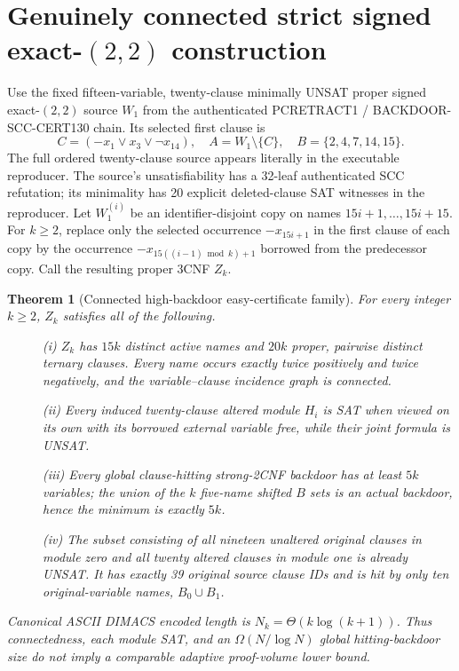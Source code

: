 \documentclass[11pt]{article}
\newtheorem{theorem}{Theorem}
\begin{document}
\section{Genuinely connected strict signed exact-$(2,2)$ construction}
Use the fixed fifteen-variable, twenty-clause minimally UNSAT proper signed exact-$(2,2)$ source $W_1$ from the authenticated PCRETRACT1 / BACKDOOR-SCC-CERT130 chain. Its selected first clause is
\[
C=(-x_1\vee x_3\vee\neg x_{14}),\quad A=W_1\setminus\{C\},\quad B=\{2,4,7,14,15\}.
\]
The full ordered twenty-clause source appears literally in the executable reproducer. The source's unsatisfiability has a 32-leaf authenticated SCC refutation; its minimality has 20 explicit deleted-clause SAT witnesses in the reproducer. Let $W_1^{(i)}$ be an identifier-disjoint copy on names $15i+1,\dots,15i+15$. For $k\ge2$, replace only the selected occurrence $-x_{15i+1}$ in the first clause of each copy by the occurrence $-x_{15((i-1)\bmod k)+1}$ borrowed from the predecessor copy. Call the resulting proper 3CNF $Z_k$.
\begin{theorem}[Connected high-backdoor easy-certificate family]\label{th:connected}
For every integer $k\ge2$, $Z_k$ satisfies all of the following.
\begin{description}
\item[] (i) $Z_k$ has $15k$ distinct active names and $20k$ proper, pairwise distinct ternary clauses. Every name occurs exactly twice positively and twice negatively, and the variable--clause incidence graph is connected.
\item[] (ii) Every induced twenty-clause altered module $H_i$ is SAT when viewed on its own with its borrowed external variable free, while their joint formula is UNSAT.
\item[] (iii) Every \emph{global clause-hitting} strong-2CNF backdoor has at least $5k$ variables; the union of the $k$ five-name shifted $B$ sets is an actual backdoor, hence the minimum is exactly $5k$.
\item[] (iv) The subset consisting of all nineteen unaltered original clauses in module zero and all twenty altered clauses in module one is already UNSAT. It has exactly 39 original source clause IDs and is hit by only ten original-variable names, $B_0\cup B_1$.
\end{description}
Canonical ASCII DIMACS encoded length is $N_k=\Theta(k\log(k+1))$. Thus \emph{connectedness}, \emph{each module SAT}, and an $\Omega(N/\log N)$ global hitting-backdoor size do not imply a comparable adaptive proof-volume lower bound.
\end{theorem}
\end{document}
